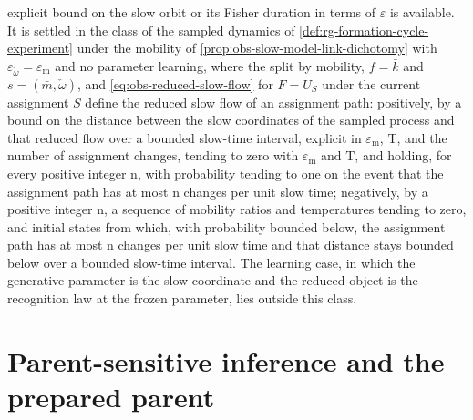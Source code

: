 explicit bound on the slow orbit or its Fisher duration in terms of $\varepsilon$ is
available. It is settled in the class of the sampled dynamics of
\cref{def:rg-formation-cycle-experiment} under the mobility of
\cref{prop:obs-slow-model-link-dichotomy} with $\varepsilon_{\check\omega}=\varepsilon_{\mathrm m}$
and no parameter learning, where the split by mobility, $f=\bar k$ and
$s=(\bar m,\check\omega)$, and \eqref{eq:obs-reduced-slow-flow} for $F=U_S$ under the
current assignment $S$ define the reduced slow flow of an assignment path: positively,
by a bound on the distance between the slow coordinates of the sampled process and
that reduced flow over a bounded slow-time interval, explicit in
$\varepsilon_{\mathrm m}$, $\mathrm T$, and the number of assignment changes, tending
to zero with $\varepsilon_{\mathrm m}$ and $\mathrm T$, and holding, for every
positive integer $\mathrm n$, with probability tending to one on the event that the
assignment path has at most $\mathrm n$ changes per unit slow time; negatively, by
a positive integer $\mathrm n$, a sequence of mobility ratios and temperatures
tending to zero, and initial states from which, with probability bounded below, the
assignment path has at most $\mathrm n$ changes per unit slow time and that
distance stays bounded below over a bounded slow-time interval. The
learning case, in which the generative parameter is the slow coordinate and the
reduced object is the recognition law at the frozen parameter, lies outside this
class.

\section{Parent-sensitive inference and the prepared parent}
\label{sec:rg-memory-parent-mechanism}


